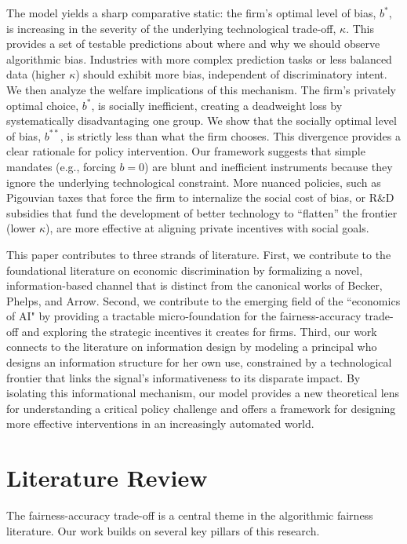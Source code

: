 \documentclass[12pt,a4paper]{article}
\theoremstyle{definition}
\theoremstyle{remark}
\begin{document}
The model yields a sharp comparative static: the firm's optimal level of bias, $b^*$, is increasing in the severity of the underlying technological trade-off, $\kappa$. This provides a set of testable predictions about where and why we should observe algorithmic bias. Industries with more complex prediction tasks or less balanced data (higher $\kappa$) should exhibit more bias, independent of discriminatory intent. We then analyze the welfare implications of this mechanism. The firm's privately optimal choice, $b^*$, is socially inefficient, creating a deadweight loss by systematically disadvantaging one group. We show that the socially optimal level of bias, $b^{**}$, is strictly less than what the firm chooses. This divergence provides a clear rationale for policy intervention. Our framework suggests that simple mandates (e.g., forcing $b=0$) are blunt and inefficient instruments because they ignore the underlying technological constraint. More nuanced policies, such as Pigouvian taxes that force the firm to internalize the social cost of bias, or R\&D subsidies that fund the development of better technology to ``flatten'' the frontier (lower $\kappa$), are more effective at aligning private incentives with social goals.

This paper contributes to three strands of literature. First, we contribute to the foundational literature on economic discrimination by formalizing a novel, information-based channel that is distinct from the canonical works of Becker, Phelps, and Arrow. Second, we contribute to the emerging field of the ``economics of AI" by providing a tractable micro-foundation for the fairness-accuracy trade-off and exploring the strategic incentives it creates for firms. Third, our work connects to the literature on information design \citep{Kamenica2011, Bergemann2019} by modeling a principal who designs an information structure for her own use, constrained by a technological frontier that links the signal's informativeness to its disparate impact. By isolating this informational mechanism, our model provides a new theoretical lens for understanding a critical policy challenge and offers a framework for designing more effective interventions in an increasingly automated world.

\section{Literature Review}

The fairness-accuracy trade-off is a central theme in the algorithmic fairness literature. Our work builds on several key pillars of this research.
\end{document}
